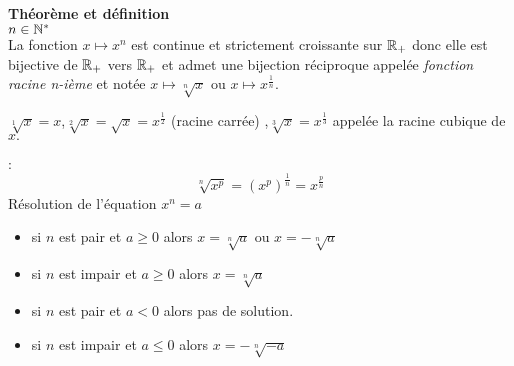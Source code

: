 
\everymath{\displaystyle}

 \summary{}
    \textbf{\color{blue}Théorème et définition }\\
$ n\in \mathbb{N}^* $\\
La fonction $x\mapsto x^{n} $  est continue et strictement croissante sur $ \mathbb{R}_+ $  donc elle est bijective de $ \mathbb{R}_+ $ vers $ \mathbb{R}_+ $ et admet une bijection réciproque appelée \emph{fonction racine n-ième} et notée $ x\mapsto \sqrt[n]{x} $ ou $x\mapsto x^{\frac{1}{n}} $.
\begin{example}
$ \sqrt[1]{x}=x $,\quad $ \sqrt[2]{x}=\sqrt{x}=x^{\frac{1}{2}}$\; (racine carrée) ,\quad $ \sqrt[3]{x} =x^{\frac{1}{3}}$  appelée la racine cubique de $ x. $
\end{example}

\textbf{\color{blue}{NB}}:
\[\sqrt[n]{x^{p}}= (x^{p})^{\frac{1}{n}}= x^{\frac{p}{n}}\]
 \colorbox{red!20!}{Résolution de l'équation $ x^{n}=a $}
\begin{itemize}
\item[\textbullet] si $ n $ est pair  et  $ a\geq 0 $ alors $ x= \sqrt[n]{a}$ ou $ x= -\sqrt[n]{a}$
\item[\textbullet] si $ n $ est impair  et  $ a\geq 0 $ alors $ x= \sqrt[n]{a}$
\item[\textbullet] si $ n $ est pair  et  $ a < 0 $ alors pas de solution. 
\item[\textbullet] si $ n $ est impair  et  $ a\leq 0 $ alors  $ x= -\sqrt[n]{-a}$
\end{itemize}

